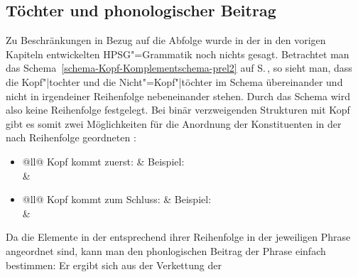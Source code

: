 \subsection{Töchter und phonologischer Beitrag}

Zu Beschränkungen in Bezug auf die Abfolge wurde in der in den vorigen Kapiteln entwickelten
HPSG"=Grammatik noch nichts gesagt. Betrachtet man das
Schema~\ref{schema-Kopf-Komplementschema-prel2} auf S.\,\pageref{schema-Kopf-Komplementschema-prel2}, so sieht man,
dass die Kopf"|tochter und die Nicht"=Kopf"|töchter im Schema übereinander und nicht in irgendeiner
Reihenfolge nebeneinander stehen. Durch das Schema wird also keine Reihenfolge festgelegt. Bei binär
verzweigenden Strukturen mit Kopf gibt es somit zwei Möglichkeiten für die Anordnung der
Konstituenten in der nach Reihenfolge geordneten \dtrsl:
\begin{itemize}
\item \begin{tabular}[t]{@{}ll@{}}
Kopf kommt zuerst:                                   & Beispiel:\\
%
&%
\\
\end{tabular}
\item \begin{tabular}[t]{@{}ll@{}}
Kopf kommt zum Schluss:                            & Beispiel:\\
%
&%
\\
\end{tabular}
\end{itemize}
Da die Elemente in der \dtrsl entsprechend ihrer Reihenfolge in der jeweiligen Phrase angeordnet sind, kann man
den phonlogischen Beitrag der Phrase einfach bestimmen: Er ergibt sich aus der Verkettung der
